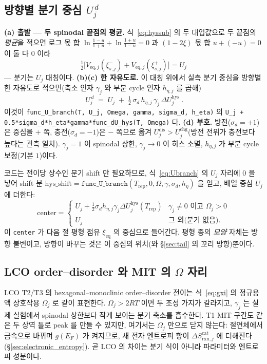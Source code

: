 \documentclass[11pt,a4paper]{article}
\newcommand{\eq}{\mathrm{eq}}
\newcommand{\rxn}{\mathrm{rxn}}
\newcommand{\dis}{\mathrm{dis}}
\newcommand{\chg}{\mathrm{chg}}
\newcommand{\hys}{\mathrm{hys}}
\newcommand{\rep}{\mathrm{rep}}
\newcommand{\code}[1]{\texttt{#1}}
\begin{document}
\subsection{방향별 분기 중심 $U_j^{\,d}$}
\textbf{(a) 출발 — 두 spinodal 끝점의 평균.} 식~\eqref{eq:hyssub} 의 두 대입값으로 두 끝점의 \emph{평균}을 적으면
로그 몫 합 $\ln\frac{1-u}{1+u}+\ln\frac{1+u}{1-u}=0$ 과 $(1-2\xi)$ 몫 합 $u+(-u)=0$ 이 둘 다 $0$ 이라
\begin{equation}
\tfrac12\big[V_{\eq,j}(\xi_{s,j}^-)+V_{\eq,j}(\xi_{s,j}^+)\big]=U_j
\label{eq:hyssym}
\end{equation}
— 분기는 $U_j$ 대칭이다. \textbf{(b)(c) 한 자유도로.} 이 대칭 위에서 실측 분기 중심을 방향별 한 자유도로 적으면(축소
인자 $\gamma_j$ 와 부분 cycle 인자 $h_{\eta,j}$ 를 곱해)
\begin{equation}
\boxed{\;U_j^{\,d}\;=\;U_j\;+\;\tfrac12\,\sigma_d\,h_{\eta,j}\,\gamma_j\,\Delta U_j^\hys\;.}
\label{eq:Ubranch}
\end{equation}
이것이 \code{func\_U\_branch(T, U\_j, Omega, gamma, sigma\_d, h\_eta)} 의
\code{U\_j + 0.5*sigma\_d*h\_eta*gamma*func\_dU\_hys(T, Omega)} 다. \textbf{(d) 부호.} 방전($\sigma_d=+1$)은 중심을
$+$ 쪽, 충전($\sigma_d=-1$)은 $-$ 쪽으로 옮겨 $U_j^{\dis}>U_j^{\chg}$(방전 전위가 충전보다 높다는 관측 일치).
$\gamma_j=1$ 이 spinodal 상한, $\gamma_j\to0$ 이 히스 소멸, $h_{\eta,j}$ 가 부분 cycle 보정(기본 $1$)이다.

코드는 전이당 상수인 분기 shift 만 필요하므로, 식~\eqref{eq:Ubranch} 의 $U_j$ 자리에 $0$ 을 넣어 shift 분
$\mathrm{hys\_shift}=\code{func\_U\_branch}(T_\rep,0,\Omega,\gamma,\sigma_d,h_\eta)$ 을 얻고, 배열 중심 $U_j$ 에 더한다:
\begin{equation}
\mathrm{center}=
\begin{cases}
U_j+\tfrac12\sigma_d h_{\eta,j}\gamma_j\Delta U_j^\hys(T_\rep) & \gamma_j\ne0 \text{ 이고 } \Omega_j>0\\[2pt]
U_j & \text{그 외(분기 없음)}.
\end{cases}
\label{eq:center}
\end{equation}
이 \code{center} 가 다음 절 평형 점유 $\xi_\eq$ 의 중심으로 들어간다. 평형 종의 \emph{모양} 자체는 방향 불변이고,
방향이 바꾸는 것은 이 중심의 위치(와 \S\ref{sec:tail} 의 꼬리 방향)뿐이다.

\subsection{LCO order--disorder 와 MIT 의 $\Omega$ 자리}
LCO T2/T3 의 hexagonal--monoclinic order--disorder 전이는 식~\eqref{eq:gxi} 의 정규용액 상호작용 $\Omega_j$ 로
같이 표현한다. $\Omega_j>2RT$ 이면 두 조성 가지가 갈라지고, $\gamma_j$ 는 실제 실험에서 spinodal 상한보다 작게 보이는
분기 축소를 흡수한다. T1 MIT 구간도 같은 두 상역 틀로 peak 를 만들 수 있지만, 여기서는 $\Omega_j$ 만으로 닫지 않는다:
절연체에서 금속으로 바뀌며 $g(E_F)$ 가 켜지므로, 새 전자 엔트로피 항이 $\Delta S_{\rxn,j}^\mathrm{cat}$ 에 더해진다
(\S\ref{sec:electronic_entropy}). 곧 LCO 의 차이는 분기 식이 아니라 파라미터와 엔트로피 성분이다.
\end{document}
